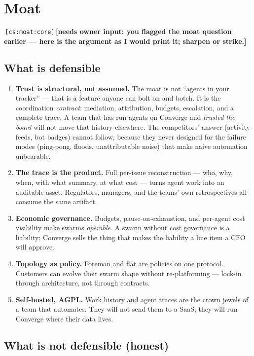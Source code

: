 \documentclass[11pt,a4paper]{report}
\newcommand{\cs}[1]{\,\texttt{\scriptsize[cs:#1]}\label{cs:#1}}
\newcommand{\owner}[1]{\,\textcolor{red!60!black}{\textbf{[needs owner input: #1]}}}
\begin{document}
\chapter{Moat}
\label{ch:moat}

\cs{moat:core}\owner{you flagged the moat question earlier --- here is
  the argument as I would print it; sharpen or strike.}

\section{What is defensible}

\begin{enumerate}[label=\arabic*.]
\item \textbf{Trust is structural, not assumed.} The moat is not
  ``agents in your tracker'' --- that is a feature anyone can bolt on and
  botch. It is the coordination \emph{contract}: mediation, attribution,
  budgets, escalation, and a complete trace. A team that has run agents
  on Converge and \emph{trusted the board} will not move that history
  elsewhere. The competitors' answer (activity feeds, bot badges) cannot
  follow, because they never designed for the failure modes (ping-pong,
  floods, unattributable noise) that make naive automation unbearable.
\item \textbf{The trace is the product.} Full per-issue reconstruction
  --- who, why, when, with what summary, at what cost --- turns agent
  work into an auditable asset. Regulators, managers, and the teams' own
  retrospectives all consume the same artifact.
\item \textbf{Economic governance.} Budgets, pause-on-exhaustion, and
  per-agent cost visibility make swarms \emph{operable}. A swarm without
  cost governance is a liability; Converge sells the thing that makes the
  liability a line item a CFO will approve.
\item \textbf{Topology as policy.} Foreman and flat are policies on one
  protocol. Customers can evolve their swarm shape without re-platforming
  --- lock-in through architecture, not through contracts.
\item \textbf{Self-hosted, AGPL.} Work history and agent traces are the
  crown jewels of a team that automates. They will not send them to a
  SaaS; they will run Converge where their data lives.
\end{enumerate}

\section{What is not defensible (honest)}
\end{document}
